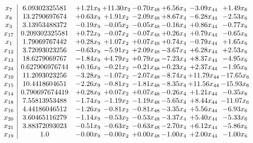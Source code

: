 \documentclass[8pt]{article}
\begin{document}
\[\begin{array}{c| c c@{\hskip 2pt} c@{\hskip 2pt} c@{\hskip 2pt} c@{\hskip 2pt} c@{\hskip 2pt} c@{\hskip 2pt} }
 x_{7}   &  6.09302325581 & +  1.21 x_{9} & + 11.30 x_{2} & -0.70 x_{48} & +  6.56 x_{4} & -3.09 x_{44} & +  1.49 x_{6}\\
 x_{8}   &  13.2790697674 & +  0.63 x_{9} & +  1.91 x_{2} & -2.09 x_{48} & +  8.67 x_{4} & -6.28 x_{44} & -2.53 x_{6}\\
 x_{3}   &  3.13953488372 & -0.19 x_{9} & -0.05 x_{2} & -0.05 x_{48} & -0.16 x_{4} & +  0.86 x_{44} & -0.77 x_{6}\\
 x_{17}   &  0.209302325581 & +  0.72 x_{9} & -0.07 x_{2} & -0.07 x_{48} & +  0.26 x_{4} & +  0.79 x_{44} & -0.65 x_{6}\\
 x_{1}   &  1.79069767442 & +  0.28 x_{9} & +  1.07 x_{2} & +  0.07 x_{48} & +  0.74 x_{4} & -0.79 x_{44} & +  1.65 x_{6}\\
 x_{12}   &  3.72093023256 & -0.63 x_{9} & -5.91 x_{2} & +  2.09 x_{48} & -3.67 x_{4} & +  6.28 x_{44} & +  2.53 x_{6}\\
 x_{13}   &  18.6279069767 & -1.84 x_{9} & +  4.79 x_{2} & +  0.79 x_{48} & -7.23 x_{4} & +  8.37 x_{44} & -4.95 x_{6}\\
 x_{24}   &  0.627906976744 & +  0.16 x_{9} & -0.21 x_{2} & -0.21 x_{48} & -0.23 x_{4} & +  2.37 x_{44} & -1.95 x_{6}\\
 x_{10}   &  11.2093023256 & -3.28 x_{9} & -1.07 x_{2} & -2.07 x_{48} & -8.74 x_{4} & + 11.79 x_{44} & -17.65 x_{6}\\
 x_{15}   &  10.4418604651 & -2.26 x_{9} & -0.81 x_{2} & -1.81 x_{48} & -8.35 x_{4} & + 11.56 x_{44} & -15.93 x_{6}\\
 x_{14}   &  0.790697674419 & +  0.28 x_{9} & +  0.07 x_{2} & +  0.07 x_{48} & -0.26 x_{4} & +  1.21 x_{44} & -0.35 x_{6}\\
 x_{18}   &  7.55813953488 & -1.74 x_{9} & -1.19 x_{2} & -1.19 x_{48} & -5.65 x_{4} & +  8.44 x_{44} & -11.07 x_{6}\\
 x_{16}   &  4.44186046512 & -1.26 x_{9} & -0.81 x_{2} & -0.81 x_{48} & -3.35 x_{4} & +  5.56 x_{44} & -6.93 x_{6}\\
 x_{20}   &  3.60465116279 & -1.14 x_{9} & -0.53 x_{2} & -0.53 x_{48} & -3.37 x_{4} & +  5.40 x_{44} & -5.33 x_{6}\\
 x_{21}   &  3.88372093023 & -0.51 x_{9} & -0.63 x_{2} & -0.63 x_{48} & -2.70 x_{4} & +  6.12 x_{44} & -5.86 x_{6}\\
 x_{19}   &  1.0 & -0.00 x_{9} & -0.00 x_{2} & +  0.00 x_{48} & -1.00 x_{4} & +  2.00 x_{44} & -1.00 x_{6}\\

\end{array}\]
\end{document}
